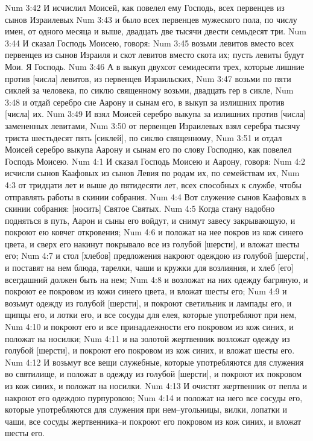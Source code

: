 Num 3:42  И исчислил Моисей, как повелел ему Господь, всех первенцев из сынов Израилевых
Num 3:43  и было всех первенцев мужеского пола, по числу имен, от одного месяца и выше, двадцать две тысячи двести семьдесят три.
Num 3:44  И сказал Господь Моисею, говоря:
Num 3:45  возьми левитов вместо всех первенцев из сынов Израиля и скот левитов вместо скота их; пусть левиты будут Мои. Я Господь.
Num 3:46  А в выкуп двухсот семидесяти трех, которые лишние против [числа] левитов, из первенцев Израильских,
Num 3:47  возьми по пяти сиклей за человека, по сиклю священному возьми, двадцать гер в сикле,
Num 3:48  и отдай серебро сие Аарону и сынам его, в выкуп за излишних против [числа] их.
Num 3:49  И взял Моисей серебро выкупа за излишних против [числа] замененных левитами,
Num 3:50  от первенцев Израилевых взял серебра тысячу триста шестьдесят пять [сиклей], по сиклю священному,
Num 3:51  и отдал Моисей серебро выкупа Аарону и сынам его по слову Господню, как повелел Господь Моисею.
Num 4:1  И сказал Господь Моисею и Аарону, говоря:
Num 4:2  исчисли сынов Каафовых из сынов Левия по родам их, по семействам их,
Num 4:3  от тридцати лет и выше до пятидесяти лет, всех способных к службе, чтобы отправлять работы в скинии собрания.
Num 4:4  Вот служение сынов Каафовых в скинии собрания: [носить] Святое Святых.
Num 4:5  Когда стану надобно подняться в путь, Аарон и сыны его войдут, и снимут завесу закрывающую, и покроют ею ковчег откровения;
Num 4:6  и положат на нее покров из кож синего цвета, и сверх его накинут покрывало все из голубой [шерсти], и вложат шесты его;
Num 4:7  и стол [хлебов] предложения накроют одеждою из голубой [шерсти], и поставят на нем блюда, тарелки, чаши и кружки для возлияния, и хлеб [его] всегдашний должен быть на нем;
Num 4:8  и возложат на них одежду багряную, и покроют ее покровом из кожи синего цвета, и вложат шесты его;
Num 4:9  и возьмут одежду из голубой [шерсти], и покроют светильник и лампады его, и щипцы его, и лотки его, и все сосуды для елея, которые употребляют при нем,
Num 4:10  и покроют его и все принадлежности его покровом из кож синих, и положат на носилки;
Num 4:11  и на золотой жертвенник возложат одежду из голубой [шерсти], и покроют его покровом из кож синих, и вложат шесты его.
Num 4:12  И возьмут все вещи служебные, которые употребляются для служения во святилище, и положат в одежду из голубой [шерсти], и покроют их покровом из кож синих, и положат на носилки.
Num 4:13  И очистят жертвенник от пепла и накроют его одеждою пурпуровою;
Num 4:14  и положат на него все сосуды его, которые употребляются для служения при нем--угольницы, вилки, лопатки и чаши, все сосуды жертвенника--и покроют его покровом из кож синих, и вложат шесты его.
